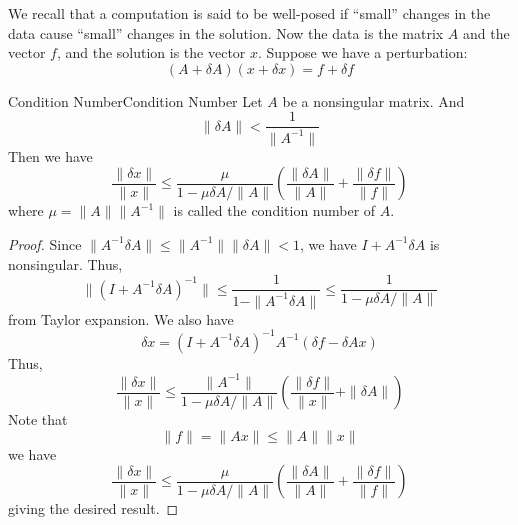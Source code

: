 \documentclass[../main.tex]{subfiles}
\begin{document}
We recall that a computation is said to be well-posed if ``small'' changes in the data cause ``small'' changes in the solution. Now the data is the matrix $A$ and the vector $f$, and the solution is the vector $x$. Suppose we have a perturbation:
\begin{equation*}
	(A + \delta A)(x + \delta x) = f + \delta f
\end{equation*}

\begin{theorem}{Condition Number}{Condition Number}
	Let $A$ be a nonsingular matrix. And
	\begin{equation*}
		\| \delta A \| < \frac{1}{\| A^{-1} \|}
	\end{equation*}
	Then we have
	\begin{equation}
		\frac{\| \delta x \|}{\| x \|} \leq \frac{\mu}{1 - \mu \delta A / \| A \|} \left( \frac{\| \delta A \|}{\| A \|} + \frac{\| \delta f \|}{\| f \|} \right)
	\end{equation}
	where $\mu = \| A \| \| A^{-1} \|$ is called the condition number of $A$.
\end{theorem}
\begin{proof}
	Since $\| A^{-1} \delta A \| \leq \| A^{-1} \| \| \delta A \| < 1$, we have $I + A^{-1} \delta A$ is nonsingular. Thus,
	\begin{equation*}
		\| (I + A^{-1} \delta A)^{-1} \| \leq \frac{1}{1 - \| A^{-1} \delta A \|} \leq \frac{1}{1 - \mu \delta A / \| A \|}
	\end{equation*}
	from Taylor expansion. We also have
	\begin{equation*}
		\delta x = (I + A^{-1} \delta A)^{-1} A^{-1} (\delta f - \delta A x)
	\end{equation*}
	Thus,
	\begin{equation*}
		\frac{\| \delta x \|}{\| x \|} \leq \frac{\| A^{-1} \|}{1 - \mu \delta A / \| A \|} \left( \frac{\| \delta f \|}{\| x \|} + \| \delta A \| \right)
	\end{equation*}
	Note that
	\begin{equation*}
		\| f \| = \| A x \| \leq \| A \| \| x \|
	\end{equation*}
	we have
	\begin{equation*}
		\frac{\| \delta x \|}{\| x \|} \leq \frac{\mu}{1 - \mu \delta A / \| A \|} \left( \frac{\| \delta A \|}{\| A \|} + \frac{\| \delta f \|}{\| f \|} \right)
	\end{equation*}
	giving the desired result.
\end{proof}
\end{document}
